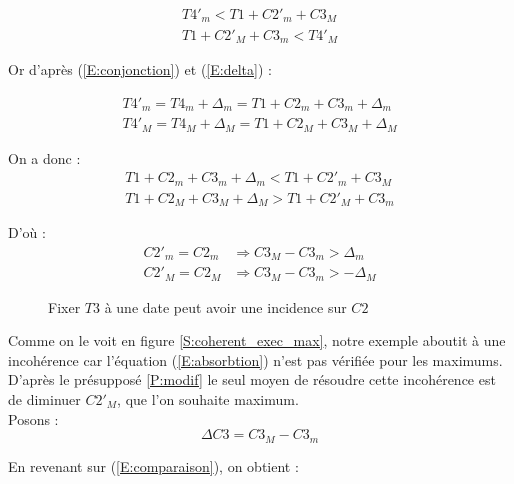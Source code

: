 \documentclass[10pt,a4paper]{article}
\begin{document}
	\begin{eqnarray}
		T4'_m < T1 + C2'_m + C3_M \\
		T1 + C2'_M + C3_m < T4'_M \nonumber
	\end{eqnarray}

Or d'après (\ref{E:conjonction}) et (\ref{E:delta}) :

	\begin{eqnarray}
		T4'_m = T4_m + \Delta{}_m = T1 + C2_m + C3_m + \Delta{}_m \\
		T4'_M = T4_M + \Delta{}_M = T1 + C2_M + C3_M + \Delta{}_M \nonumber
	\end{eqnarray}

On a donc :
	\begin{eqnarray}
		T1 + C2_m + C3_m + \Delta{}_m < T1 + C2'_m + C3_M \\
		T1 + C2_M + C3_M + \Delta{}_M > T1 + C2'_M + C3_m  \nonumber
		\label{E:comparaison}
	\end{eqnarray}

D'où :
	\begin{eqnarray}
		C2'_m = C2_m &\Rightarrow C3_M - C3_m > \Delta{}_m \\
		C2'_M = C2_M &\Rightarrow C3_M - C3_m > -\Delta{}_M \nonumber
		\label{E:absorbtion}
	\end{eqnarray}


	\begin{figure}[htp]
		\begin{center}
			\hspace{5pt}
	
		\caption{Fixer $T3$ à une date peut avoir une incidence sur $C2$}
		\end{center}
	\end{figure}

Comme on le voit en figure \ref{S:coherent_exec_max}, notre exemple aboutit à une incohérence car l'équation (\ref{E:absorbtion}) n'est pas vérifiée pour les maximums. D'après le présupposé \ref{P:modif} le seul moyen de résoudre cette incohérence est de diminuer $C2'_M$, que l'on souhaite maximum. \\
Posons : $$\Delta{C3} = C3_M - C3_m$$

En revenant sur (\ref{E:comparaison}), on obtient :
\end{document}
